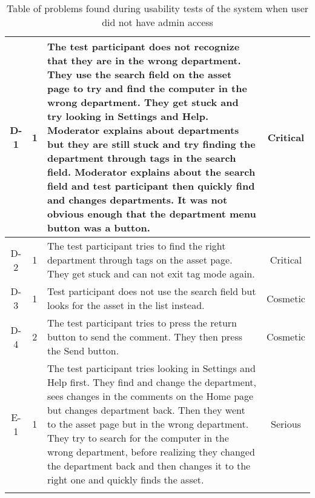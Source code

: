 \begin{longtable}{| c | c | p{8cm} | c |}
        \\
        \hline
        D-1 & 1 & The test participant does not recognize that they are in the wrong department. They use the search field on the asset page to try and find the computer in the wrong department. They get stuck and try looking in Settings and Help. Moderator explains about departments but they are still stuck and try finding the department through tags in the search field. Moderator explains about the search field and test participant then quickly find and changes departments. It was not obvious enough that the department menu button was a button. & Critical
        \\
        \hline
        D-2 & 1 & The test participant tries to find the right department through tags on the asset page. They get stuck and can not exit tag mode again. &  Critical
        \\
        \hline
        D-3 & 1 & Test participant does not use the search field but looks for the asset in the list instead. & Cosmetic
        \\
        \hline
        D-4 & 2 & The test participant tries to press the return button to send the comment. They then press the Send button. & Cosmetic
        \\
        \hline
        E-1 & 1 & The test participant tries looking in Settings and Help first. They find and change the department, sees changes in the comments on the Home page but changes department back. Then they went to the asset page but in the wrong department. They try to search for the computer in the wrong department, before realizing they changed the department back and then changes it to the right one and quickly finds the asset. & Serious
        \\
        \hline
        
    \caption{Table of problems found during usability tests of the system when user did not have admin access}
    \label{tab:EmployeeProblems}
   
\end{longtable}